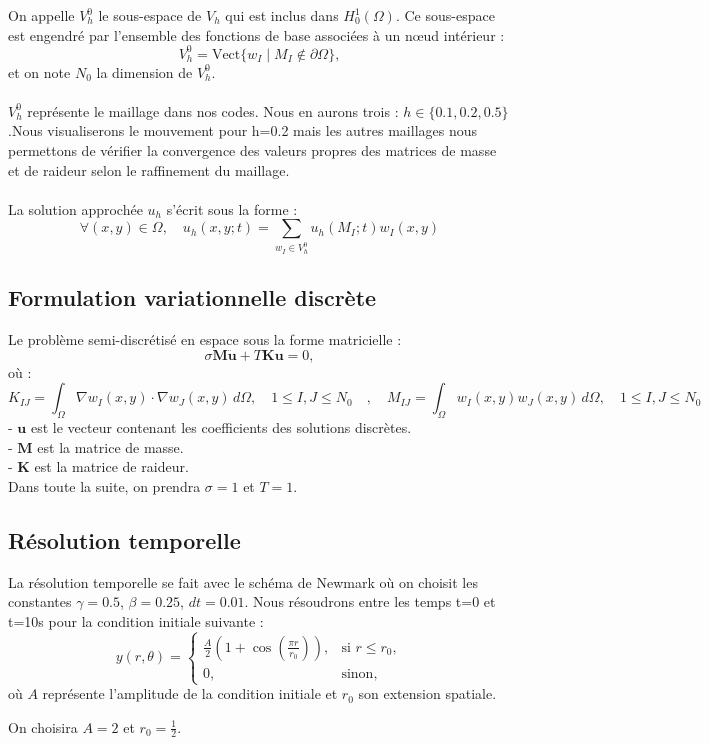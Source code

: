 \documentclass[a4paper,11pt]{article}
\begin{document}
	On appelle \(V_h^0\) le sous-espace de \(V_h\) qui est inclus dans \(H^1_0(\Omega)\). Ce sous-espace est engendré par l’ensemble des fonctions de base associées à un nœud intérieur :
	\[
	V_h^0 = \text{Vect} \{ w_I \; | \; M_I \notin \partial \Omega \},
	\]
	et on note \(N_0\) la dimension de \(V_h^0\). \\ \\
	 \(V_h^0\) représente le maillage dans nos codes. Nous en aurons trois : $h \in \{0.1, 0.2, 0.5\}$.Nous visualiserons le mouvement pour h=0.2 mais les autres maillages nous permettons de vérifier la convergence des valeurs propres des matrices de masse et de raideur selon le raffinement du maillage.\\ \\
	La solution approchée \(u_h\) s’écrit sous la forme :
	\[
	\forall (x, y) \in \Omega , \quad u_h(x, y; t)  = \sum_{w_I \in V_h^0} u_h(M_I; t) w_I(x, y) 
	\]
	
	\subsection*{Formulation variationnelle discrète}
	
	Le problème semi-discrétisé en espace sous la forme matricielle :
	\[
	\sigma \mathbf{M} \ddot{\mathbf{u}} + T \mathbf{K} \mathbf{u} = 0,
	\]
	où :
	\[
	K_{IJ} = \int_{\Omega} \nabla w_I(x, y) \cdot \nabla w_J(x, y) \, d\Omega, \quad 1 \leq I, J \leq N_0  \quad , \quad  M_{IJ} = \int_{\Omega} w_I(x, y) w_J(x, y) \, d\Omega, \quad 1 \leq I, J \leq N_0
	\]
	- \(\mathbf{u}\) est le vecteur contenant les coefficients des solutions discrètes.\\
	- \(\mathbf{M}\) est la matrice de masse.\\
	- \(\mathbf{K}\) est la matrice de raideur.\\
	
	Dans toute la suite, on prendra \(\sigma = 1\) et \(T = 1\).
	\subsection*{Résolution temporelle}
	La résolution temporelle se fait avec le schéma de Newmark où on choisit les constantes $\gamma=0.5$, $\beta=0.25$, $dt=0.01$. Nous résoudrons entre les temps t=0 et t=10s pour la condition initiale suivante :
	\[
	y(r, \theta) = 
	\begin{cases} 
		\frac{A}{2} (1 + \cos(\frac{ \pi r}{r_0})), & \text{si } r \leq r_0, \\
		0, & \text{sinon},
	\end{cases}
	\]
	où \(A\) représente l’amplitude de la condition initiale et \(r_0\) son extension spatiale.
	
	On choisira \(A = 2\) et \(r_0 = \frac{1}{2}\).
\end{document}
